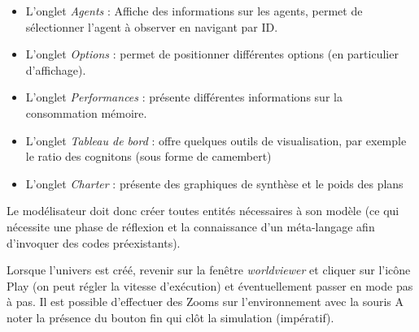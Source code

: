 \documentclass[a4paper,oneside,12 pt]{article}
\begin{document}
\begin{itemize}
\item L'onglet \textit{Agents} : Affiche des informations sur les agents, permet de sélectionner l’agent à observer en navigant par ID.
\item L'onglet \textit{Options} : permet de positionner différentes options (en particulier d’affichage). 

\item  L'onglet \textit{Performances} : présente différentes informations sur la consommation mémoire.
\item L'onglet \textit{Tableau de bord} : offre quelques outils de visualisation, par exemple le ratio des cognitons (sous forme de camembert)
\item L'onglet \textit{Charter} : présente des graphiques de synthèse et le poids des plans 

\end{itemize}


	

	
	

	
	

	










Le modélisateur doit donc créer toutes entités nécessaires à son modèle (ce qui nécessite une phase de réflexion et la connaissance d'un méta-langage afin d'invoquer des codes préexistants).

Lorsque l'univers est créé, revenir sur la fenêtre \textit{worldviewer} et cliquer sur l'icône Play (on peut régler la vitesse d'exécution) et éventuellement passer en mode pas à pas.
Il est possible d'effectuer des Zooms sur l'environnement  avec la souris 
A noter la présence du bouton fin qui clôt la simulation (impératif).
\end{document}
